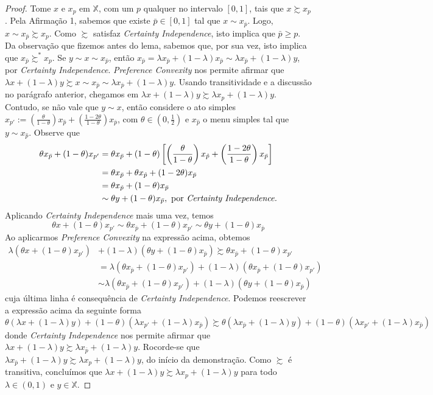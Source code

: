 \documentclass[11pt, a4paper]{article}
\theoremstyle{nonumberplain}
\newtheorem{proof}{Dem.}
\theoremstyle{plain}
\theoremstyle{plain}
\theoremstyle{plain}
\theoremstyle{nonumberplain}
\begin{document}
\begin{proof}
Tome $x$ e $x_p$ em $\mathbb{X}$, com um $p$ qualquer no intervalo $[0,1]$, tais que $x\succsim x_p$. Pela Afirmação 1, sabemos que existe $\bar{p}\in [0,1]$ tal que $x\sim x_{\bar{p}}$. Logo, $x\sim x_{\bar{p}}\succsim x_p$. Como $\succsim$ satisfaz \emph{Certainty Independence}, isto implica que $\bar{p}\geq p$. Da observação que fizemos antes do lema, sabemos que, por sua vez, isto implica que $x_{\bar{p}}\succsim^* x_p$.
Se $y\sim x\sim x_{\bar{p}}$, então $x_{\bar{p}}=\lambda x_{\bar{p}} + (1-\lambda)x_{\bar{p}}\sim\lambda x_{\bar{p}}+(1-\lambda)y$, por \emph{Certainty Independence}. \emph{Preference Convexity} nos permite afirmar que $\lambda x+(1-\lambda)y \succsim x \sim x_{\bar{p}} \sim \lambda x_{\bar{p}}+(1-\lambda)y$. Usando transitividade e a discussão no parágrafo anterior, chegamos em $\lambda x+(1-\lambda)y\succsim \lambda x_p + (1-\lambda)y$.
Contudo, se não vale que $y\sim x$, então considere o ato simples $x_{p'}:=\left(\frac{\theta}{1-\theta}\right)x_{\hat{p}}+\left(\frac{1-2\theta}{1-\theta}\right)x_{\bar{p}}$, com $\theta\in \left(0,\frac{1}{2}\right)$ e $x_{\hat{p}}$ o menu simples tal que $y\sim x_{\hat{p}}$. Observe que
\begin{align*}
\theta x_{\bar{p}} + (1-\theta)x_{p'}&=\theta x_{\bar{p}} + (1-\theta)\left[ \left(\frac{\theta}{1-\theta}\right)x_{\hat{p}}+\left(\frac{1-2\theta}{1-\theta}\right)x_{\bar{p}}\right] \\
&=\theta x_{\bar{p}} + \theta x_{\hat{p}} + (1-2\theta)x_{\bar{p}} \\
&=\theta x_{\hat{p}} + (1-\theta)x_{\bar{p}} \\
&\sim \theta y + (1-\theta) x_{\bar{p}}, \text{ por \emph{Certainty Independence.}}
\end{align*}
Aplicando \emph{Certainty Independence} mais uma vez, temos $$\theta x + (1-\theta)x_{p'}\sim \theta x_{\bar{p}} + (1-\theta)x_{p'}\sim \theta y + (1-\theta) x_{\bar{p}}$$
Ao aplicarmos \emph{Preference Convexity} na expressão acima, obtemos
\begin{align*}
\lambda (\theta x + (1-\theta)x_{p'})&+(1-\lambda)(\theta y + (1-\theta) x_{\bar{p}}) \succsim \theta x_{\bar{p}} + (1-\theta)x_{p'}\\
&= \lambda (\theta x_{\bar{p}} + (1-\theta)x_{p'}) + (1-\lambda)(\theta x_{\bar{p}} + (1-\theta)x_{p'})\\
&\sim \lambda(\theta x_{\bar{p}} + (1-\theta)x_{p'})+(1-\lambda)(\theta y + (1-\theta) x_{\bar{p}})
\end{align*}
cuja última linha é consequência de \emph{Certainty Independence}. Podemos reescrever a expressão acima da seguinte forma
$$ \theta (\lambda x + (1-\lambda)y)+(1-\theta)(\lambda x_{p'}+(1-\lambda)x_{\bar{p}}) \succsim \theta (\lambda x_{\bar{p}} + (1-\lambda)y)+(1-\theta)(\lambda x_{p'}+(1-\lambda)x_{\bar{p}})$$
donde \emph{Certainty Independence} nos permite afirmar que $\lambda x + (1-\lambda)y\succsim \lambda x_{\bar{p}} + (1-\lambda)y$. Rocorde-se que $\lambda x_{\bar{p}} + (1-\lambda)y\succsim \lambda x_p + (1-\lambda)y$, do início da demonstração. Como $\succsim$ é transitiva, concluímos que $\lambda x + (1-\lambda)y\succsim \lambda x_p + (1-\lambda)y$ para todo $\lambda \in (0,1)$ e $y\in \mathbb{X}$.
\end{proof}
\end{document}
